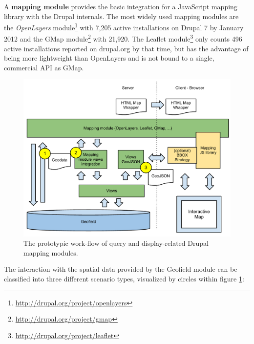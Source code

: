 A \textbf{mapping module} provides the basic integration for a JavaScript mapping library with the Drupal internals. The most widely used mapping modules are the \textit{OpenLayers} module\footnote{\url{http://drupal.org/project/openlayers}} with 7,205 active installations on Drupal 7 by January 2012 and the GMap module\footnote{\url{http://drupal.org/project/gmap}} with 21,920. The Leaflet module\footnote{\url{http://drupal.org/project/leaflet}} only counts 496 active installations reported on drupal.org by that time, but has the advantage of being more lightweight than OpenLayers and is not bound to a single, commercial API as GMap.

\begin{figure}[h]
  \begin{center}
    \includegraphics[width=1\textwidth]{figures/drupal_mapping_display.pdf}
    \caption{The prototypic work-flow of query and display-related Drupal mapping modules.}
    \label{fig:drupal-mapping-display}
  \end{center}
\end{figure}

The interaction with the spatial data provided by the Geofield module can be classified into three different scenario types, visualized by circles within figure \ref{fig:drupal-mapping-display}:

